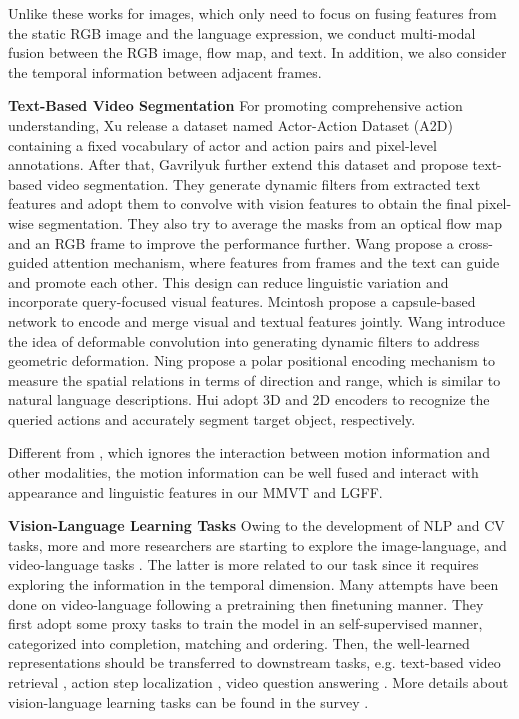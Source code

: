 \documentclass[10pt,twocolumn,letterpaper]{article}
\begin{document}
Unlike these works for images, which only need to focus on fusing features from the static RGB image and the language expression, we conduct multi-modal fusion between the RGB image, flow map, and text. In addition, we also consider the temporal information between adjacent frames. 




\noindent\textbf{Text-Based Video Segmentation} For promoting comprehensive action understanding, Xu \etal \cite{xu2015can} release a dataset named Actor-Action Dataset (A2D) containing a fixed vocabulary of actor and action pairs and pixel-level annotations. After that, Gavrilyuk \etal \cite{gavrilyuk2018actor} further extend this dataset and propose text-based video segmentation. They generate dynamic filters from extracted text features and adopt them to convolve with vision features to obtain the final pixel-wise segmentation.
They also try to average the masks from an optical flow map and an RGB frame to improve the performance further. Wang \etal \cite{wang2019asymmetric} propose a cross-guided attention mechanism, where features from frames and the text can guide and promote each other. This design can reduce linguistic variation and incorporate query-focused visual features. Mcintosh \etal \cite{mcintosh2020visual} propose a capsule-based network to encode and merge visual and textual features jointly. Wang \etal \cite{wang2020context} introduce the idea of deformable convolution \cite{dai2017deformable} into generating dynamic filters to address geometric deformation. Ning \etal \cite{ning2020polar} propose a polar positional encoding mechanism to measure the spatial relations in terms of direction and range, which is similar to natural language descriptions. Hui \etal \cite{hui2021collaborative} adopt 3D and 2D encoders to recognize the queried actions and accurately segment target object, respectively.


Different from \cite{gavrilyuk2018actor}, which ignores the interaction between motion information and other modalities, the motion information can be well fused and interact with appearance and linguistic features in our MMVT and LGFF.





\noindent\textbf{Vision-Language Learning Tasks} Owing to the development of NLP and CV tasks, more and more researchers are starting to explore the image-language, and video-language tasks \cite{vinyals2015show, lee2018stacked, antol2015vqa, tapaswi2016movieqa}. The latter is more related to our task since it requires exploring the information in the temporal dimension. Many attempts \cite{sun2019videobert, li2020hero, lei2021less, tang2021decembert} have been done on video-language following a pretraining then finetuning manner. They first adopt some proxy tasks to train the model in an 
self-supervised manner, categorized into completion, matching and ordering. Then, the well-learned representations should be transferred to downstream tasks, e.g. text-based video retrieval \cite{yu2018joint}, action step localization \cite{zhukov2019cross}, video question answering \cite{tapaswi2016movieqa}. More details about vision-language learning tasks can be found in the survey \cite{ruan2021survey}. 
\end{document}
